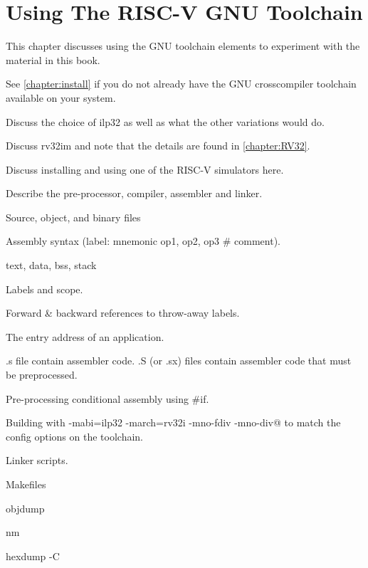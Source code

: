 \chapter{Using The RISC-V GNU Toolchain}

This chapter discusses using the GNU toolchain elements to
experiment with the material in this book.

See \autoref{chapter:install} if you do not already have the 
GNU crosscompiler toolchain available on your system.


Discuss the choice of ilp32 as well as what the other variations would do.

Discuss rv32im and note that the details are found in \autoref{chapter:RV32}.

Discuss installing and using one of the RISC-V simulators 
here.

Describe the pre-processor, compiler, assembler and linker.

Source, object, and binary files

Assembly syntax (label: mnemonic op1, op2, op3  \# comment).

text, data, bss, stack

Labels and scope.

Forward \& backward references to throw-away labels.

The entry address of an application.

.s file contain assembler code.
.S (or .sx) files contain assembler code that must be preprocessed.~\cite[p.~29]{gcc:2017}

Pre-processing conditional assembly using \#if.

Building with \verb@-mabi=ilp32 -march=rv32i -mno-fdiv -mno-div@ to match
the config options on the toolchain.  

Linker scripts.

Makefiles

objdump

nm

hexdump -C
